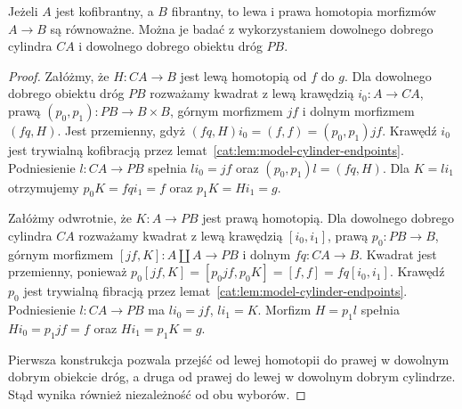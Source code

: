 \begin{stwierdzenie}\label{cat:prop:model-left-right}
Jeżeli $A$ jest kofibrantny, a $B$ fibrantny, to lewa i prawa homotopia morfizmów $A\to B$ są równoważne. Można je badać z wykorzystaniem dowolnego dobrego cylindra $CA$ i dowolnego dobrego obiektu dróg $PB$.
\end{stwierdzenie}
\begin{proof}
Załóżmy, że $H:CA\to B$ jest lewą homotopią od $f$ do $g$. Dla dowolnego dobrego obiektu dróg $PB$ rozważamy kwadrat z lewą krawędzią $i_0:A\to CA$, prawą $(p_0,p_1):PB\to B\times B$, górnym morfizmem $jf$ i dolnym morfizmem $(fq,H)$. Jest przemienny, gdyż $(fq,H)i_0=(f,f)=(p_0,p_1)jf$. Krawędź $i_0$ jest trywialną kofibracją przez lemat~\ref{cat:lem:model-cylinder-endpoints}. Podniesienie $l:CA\to PB$ spełnia $li_0=jf$ oraz $(p_0,p_1)l=(fq,H)$. Dla $K=li_1$ otrzymujemy $p_0K=fqi_1=f$ oraz $p_1K=Hi_1=g$.

Załóżmy odwrotnie, że $K:A\to PB$ jest prawą homotopią. Dla dowolnego dobrego cylindra $CA$ rozważamy kwadrat z lewą krawędzią $[i_0,i_1]$, prawą $p_0:PB\to B$, górnym morfizmem $[jf,K]:A\amalg A\to PB$ i dolnym $fq:CA\to B$. Kwadrat jest przemienny, ponieważ $p_0[jf,K]=[p_0jf,p_0K]=[f,f]=fq[i_0,i_1]$. Krawędź $p_0$ jest trywialną fibracją przez lemat~\ref{cat:lem:model-cylinder-endpoints}. Podniesienie $l:CA\to PB$ ma $li_0=jf$, $li_1=K$. Morfizm $H=p_1l$ spełnia $Hi_0=p_1jf=f$ oraz $Hi_1=p_1K=g$.

Pierwsza konstrukcja pozwala przejść od lewej homotopii do prawej w dowolnym dobrym obiekcie dróg, a druga od prawej do lewej w dowolnym dobrym cylindrze. Stąd wynika również niezależność od obu wyborów.
\end{proof}

